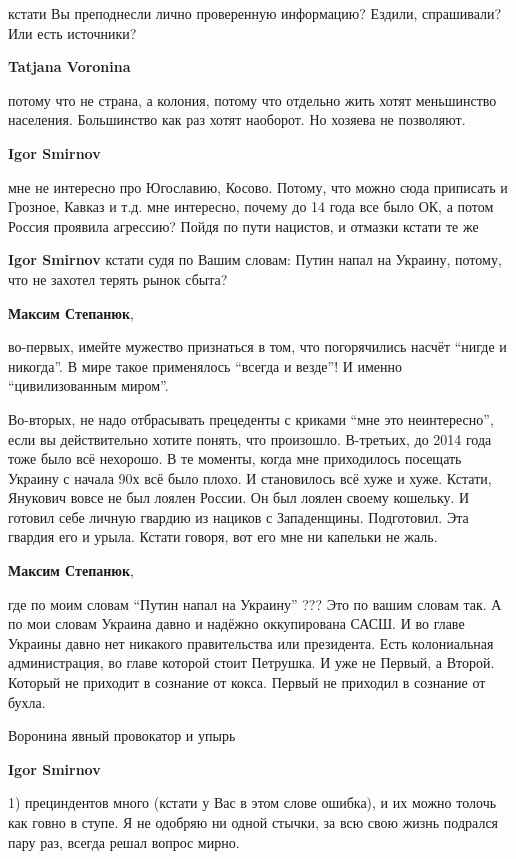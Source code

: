 \begin{itemize}
\begin{itemize}
кстати Вы преподнесли лично проверенную информацию? Ездили, спрашивали? Или
есть источники?

\textbf{Tatjana Voronina} 

потому что не страна, а колония, потому что отдельно жить хотят меньшинство
населения. Большинство как раз хотят наоборот. Но хозяева не позволяют.

\textbf{Igor Smirnov} 

мне не интересно про Югославию, Косово. Потому, что можно сюда приписать и
Грозное, Кавказ и т.д. мне интересно, почему до 14 года все было ОК, а потом
Россия проявила агрессию? Пойдя по пути нацистов, и отмазки кстати те же

\textbf{Igor Smirnov} кстати судя по Вашим словам: Путин напал на Украину, потому, что не захотел терять рынок сбыта?

\textbf{Максим Степанюк}, 

во-первых, имейте мужество признаться в том, что погорячились насчёт \enquote{нигде и
никогда}. В мире такое применялось \enquote{всегда и везде}! И именно \enquote{цивилизованным
миром}.

Во-вторых, не надо отбрасывать прецеденты с криками \enquote{мне это неинтересно}, если
вы действительно хотите понять, что произошло. В-третьих, до 2014 года тоже
было всё нехорошо. В те моменты, когда мне приходилось посещать Украину с
начала 90х всё было плохо. И становилось всё хуже и хуже. Кстати, Янукович
вовсе не был лоялен России. Он был лоялен своему кошельку. И готовил себе
личную гвардию из нациков с Западенщины. Подготовил. Эта гвардия его и урыла.
Кстати говоря, вот его мне ни капельки не жаль.

\textbf{Максим Степанюк}, 

где по моим словам \enquote{Путин напал на Украину} ??? Это по вашим словам так. А по
мои словам Украина давно и надёжно оккупирована САСШ. И во главе Украины давно
нет никакого правительства или президента. Есть колониальная администрация, во
главе которой стоит Петрушка. И уже не Первый, а Второй. Который не приходит в
сознание от кокса. Первый не приходил в сознание от бухла.

Воронина явный провокатор и упырь

\textbf{Igor Smirnov} 

1) прециндентов много (кстати у Вас в этом слове ошибка), и их можно толочь
как говно в ступе. Я не одобряю ни одной стычки, за всю свою жизнь подрался
пару раз, всегда решал вопрос мирно.


\end{itemize}
\end{itemize}
